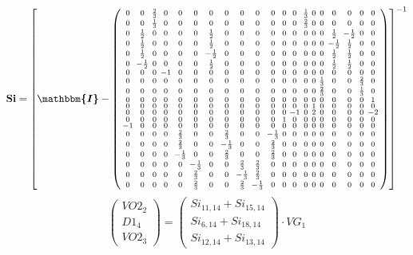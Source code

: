 \documentclass[10pt]{article} \usepackage{amsmath} \usepackage{bbold}
\begin{document}
\[ \mathbf{Si} = \left[ \boldsymbol{\mathbbm{I}}  -
\left(\begin{smallmatrix} 0 & 0 & \frac{2}{3} & 0 & 0 & 0 & 0 & 0 & 0
& 0 & 0 & 0 & 0 & \frac{1}{3} & 0 & 0 & 0 & 0 & 0 & 0 \\ 0 & 0 &
\frac{1}{3} & 0 & 0 & 0 & 0 & 0 & 0 & 0 & 0 & 0 & 0 & \frac{2}{3} & 0
& 0 & 0 & 0 & 0 & 0 \\ 0 & \frac{1}{2} & 0 & 0 & 0 & 0 & \frac{1}{2} &
0 & 0 & 0 & 0 & 0 & 0 & 0 & 0 & 0 & \frac{1}{2} & -\frac{1}{2} & 0 & 0
\\ 0 & \frac{1}{2} & 0 & 0 & 0 & 0 & \frac{1}{2} & 0 & 0 & 0 & 0 & 0 &
0 & 0 & 0 & 0 & -\frac{1}{2} & \frac{1}{2} & 0 & 0 \\ 0 & \frac{1}{2}
& 0 & 0 & 0 & 0 & -\frac{1}{2} & 0 & 0 & 0 & 0 & 0 & 0 & 0 & 0 & 0 &
\frac{1}{2} & \frac{1}{2} & 0 & 0 \\ 0 & -\frac{1}{2} & 0 & 0 & 0 & 0
& \frac{1}{2} & 0 & 0 & 0 & 0 & 0 & 0 & 0 & 0 & 0 & \frac{1}{2} &
\frac{1}{2} & 0 & 0 \\ 0 & 0 & 0 & -1 & 0 & 0 & 0 & 0 & 0 & 0 & 0 & 0
& 0 & 0 & 0 & 0 & 0 & 0 & 0 & 0 \\ 0 & 0 & 0 & 0 & 0 & 0 & 0 & 0 & 0 &
0 & 0 & 0 & 0 & 0 & 0 & \frac{1}{3} & 0 & 0 & \frac{2}{3} & 0 \\ 0 & 0
& 0 & 0 & 0 & 0 & 0 & 0 & 0 & 0 & 0 & 0 & 0 & 0 & 0 & \frac{2}{3} & 0
& 0 & \frac{1}{3} & 0 \\ 0 & 0 & 0 & 0 & 0 & 0 & 0 & 0 & 0 & 0 & 0 & 0
& 0 & 0 & 0 & 0 & 0 & 0 & 0 & 1 \\ 0 & 0 & 0 & 0 & 0 & 0 & 0 & 0 & 0 &
0 & 0 & 0 & 0 & 0 & 1 & 0 & 0 & 0 & 0 & 0 \\ 0 & 0 & 0 & 0 & 0 & 0 & 0
& 0 & 0 & 0 & 0 & 0 & -1 & 0 & 2 & 0 & 0 & 0 & 0 & -2 \\ 0 & 0 & 0 & 0
& 0 & 0 & 0 & 0 & 0 & 0 & 0 & 1 & 0 & 0 & 0 & 0 & 0 & 0 & 0 & 0 \\ -1
& 0 & 0 & 0 & 0 & 0 & 0 & 0 & 0 & 0 & 0 & 0 & 0 & 0 & 0 & 0 & 0 & 0 &
0 & 0 \\ 0 & 0 & 0 & 0 & \frac{2}{3} & 0 & 0 & \frac{2}{3} & 0 & 0 &
-\frac{1}{3} & 0 & 0 & 0 & 0 & 0 & 0 & 0 & 0 & 0 \\ 0 & 0 & 0 & 0 &
\frac{2}{3} & 0 & 0 & -\frac{1}{3} & 0 & 0 & \frac{2}{3} & 0 & 0 & 0 &
0 & 0 & 0 & 0 & 0 & 0 \\ 0 & 0 & 0 & 0 & -\frac{1}{3} & 0 & 0 &
\frac{2}{3} & 0 & 0 & \frac{2}{3} & 0 & 0 & 0 & 0 & 0 & 0 & 0 & 0 & 0
\\ 0 & 0 & 0 & 0 & 0 & -\frac{1}{3} & 0 & 0 & \frac{2}{3} &
\frac{2}{3} & 0 & 0 & 0 & 0 & 0 & 0 & 0 & 0 & 0 & 0 \\ 0 & 0 & 0 & 0 &
0 & \frac{2}{3} & 0 & 0 & -\frac{1}{3} & \frac{2}{3} & 0 & 0 & 0 & 0 &
0 & 0 & 0 & 0 & 0 & 0 \\ 0 & 0 & 0 & 0 & 0 & \frac{2}{3} & 0 & 0 &
\frac{2}{3} & -\frac{1}{3} & 0 & 0 & 0 & 0 & 0 & 0 & 0 & 0 & 0 & 0
\end{smallmatrix}\right) \right]^{-1} \]
\[ \left(\begin{array}{c} VO2_{2} \\ D1_{4} \\ VO2_{3}
\end{array}\right)=\left(\begin{smallmatrix} Si_{11,14} + Si_{15,14}
\\ Si_{6,14} + Si_{18,14} \\ Si_{12,14} + Si_{13,14}
\end{smallmatrix}\right)\cdot VG_{1} \]
\end{document}
